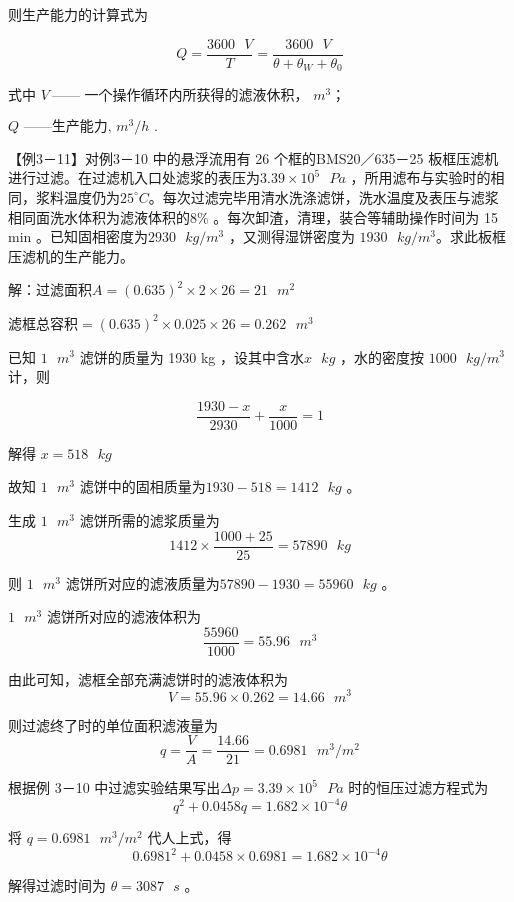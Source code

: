 \documentclass[
]{article}
\begin{document}
则生产能力的计算式为

\[Q = \frac{3600\text{\ }V}{T} = \frac{3600\text{\ }V}{\theta + \theta_{W} + \theta_{0}}\]

式中 \(V ~——\) 一个操作循环内所获得的滤液休积， \(m^{3}\)；

\(Q\text{~——生产}\text{能}\text{力}\text{,}\text{~}m^{3}/h\text{~. ~}\)

【例3－11】对例3－10 中的悬浮流用有 26 个框的BMS20／635－25
板框压滤机进行过滤。在过滤机入口处滤浆的表压为\(3.39 \times 10^{5}\text{\ }Pa\) ，所用滤布与实验时的相同，浆料温度仍为\(25^{\circ}C\)。每次过滤完毕用清水洗涤滤饼，洗水温度及表压与滤浆相同面洗水体积为滤液体积的\(8\%\) 。每次卸渣，清理，装合等辅助操作时间为 15 min 。已知固相密度为\(2930\text{\ }kg/m^{3}\) ，又测得湿饼密度为 \(1930\text{\ }kg/m^{3}\)。求此板框压滤机的生产能力。

解：过滤面积\(A = (0.635)^{2} \times 2 \times 26 = 21{\text{\ }m}^{2}\)

滤框总容积\(= (0.635)^{2} \times 0.025 \times 26 = 0.262{\text{\ }m}^{3}\)

已知 \(1{\text{\ }m}^{3}\) 滤饼的质量为 1930 kg ，设其中含水\(x\text{\ }kg\) ，水的密度按 \(1000\text{\ }kg/m^{3}\) 计，则

\[\frac{1930 - x}{2930} + \frac{x}{1000} = 1\]

解得 \(x = 518\text{\ }kg\)

故知 \(1{\text{\ }m}^{3}\) 滤饼中的固相质量为\(1930 - 518 = 1412\text{\ }kg\) 。

生成 \(1{\text{\ }m}^{3}\) 滤饼所需的滤浆质量为\[1412 \times \frac{1000 + 25}{25} = 57890\text{\ }kg\]

则 \(1{\text{\ }m}^{3}\) 滤饼所对应的滤液质量为\(57890 - 1930 = 55960\text{\ }kg\) 。

\(1{\text{\ }m}^{3}\) 滤饼所对应的滤液体积为\[\frac{55960}{1000} = 55.96{\text{\ }m}^{3}\]

由此可知，滤框全部充满滤饼时的滤液体积为\[V = 55.96 \times 0.262 = 14.66{\text{\ }m}^{3}\]

则过滤终了时的单位面积滤液量为\[q = \frac{V}{A} = \frac{14.66}{21} = 0.6981{\text{\ }m}^{3}/m^{2}\]

根据例 3－10 中过滤实验结果写出\(\Delta p = 3.39 \times 10^{5}\text{\ }Pa\) 时的恒压过滤方程式为\[q^{2} + 0.0458q = 1.682 \times 10^{- 4}\theta\]

将 \(q = 0.6981{\text{\ }m}^{3}/m^{2}\) 代人上式，得\[{0.6981}^{2} + 0.0458 \times 0.6981 = 1.682 \times 10^{- 4}\theta\]

解得过滤时间为 \(\theta = 3087\text{\ }s\) 。
\end{document}
